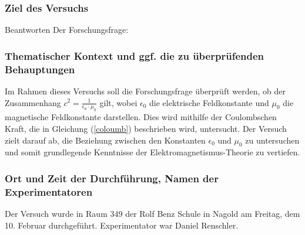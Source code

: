 \documentclass[a4paper]{report}
\begin{document}
\subsubsection{Ziel des Versuchs} %
\label{ssub:Ziel des Versuchs}
Beantworten Der Forschungsfrage:


\subsubsection{Thematischer Kontext und ggf. die zu überprüfenden Behauptungen} %
\label{ssub:Thematischer Kontext und ggf. die zu überprüfenden Behauptungen}
Im Rahmen dieses Versuchs soll die Forschungsfrage überprüft werden, ob der
Zusammenhang $c^2 = \frac{1}{\epsilon_0 \cdot \mu_0}$ gilt, wobei $\epsilon_0$
die elektrische Feldkonstante und $\mu_0$ die magnetische Feldkonstante
darstellen. Dies wird mithilfe der Coulombschen Kraft, die in Gleichung
(\ref{coloumb}) beschrieben wird, untersucht. Der Versuch zielt darauf ab, die
Beziehung zwischen den Konstanten $\epsilon_0$ und $\mu_0$ zu untersuchen und
somit grundlegende Kenntnisse der Elektromagnetismus-Theorie zu vertiefen.



\subsubsection{Ort und Zeit der Durchführung, Namen der Experimentatoren} %
\label{ssub:Ort-und-Zeit-der-Durchführung-Namen-der-Experimentatoren}
Der Versuch wurde in Raum 349 der Rolf Benz Schule in Nagold am Freitag, dem
10. Februar durchgeführt. Experimentator war Daniel Renschler.
\end{document}

